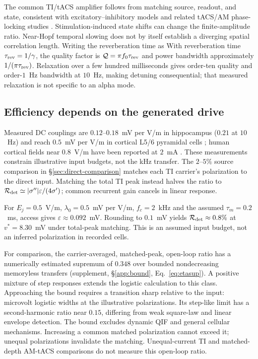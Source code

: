 \documentclass[11pt,a4paper]{article}
\newcommand{\Sig}{\sigma}
\providecommand{\DIFaddtex}[1]{{\protect\color{blue} \sf #1}} %
\providecommand{\DIFdeltex}[1]{{\protect\color{red} \scriptsize #1}} %
\providecommand{\DIFaddbegin}{} %
\providecommand{\DIFaddend}{} %
\providecommand{\DIFdelbegin}{} %
\providecommand{\DIFdelend}{} %
\providecommand{\DIFadd}[1]{\texorpdfstring{\DIFaddtex{#1}}{#1}} %
\providecommand{\DIFdel}[1]{\texorpdfstring{\DIFdeltex{#1}}{}} %
\begin{document}
The common TI/tACS amplifier follows from matching source, readout, and state,
consistent with excitatory--inhibitory models \cite{ledoux2011,clusella2023}
and related tACS/AM phase-locking studies
\cite{ali2013,negahbani2018,krause2023}. Stimulation-induced state shifts can
change the finite-amplitude ratio. Near-Hopf temporal slowing does not by itself
establish a diverging spatial correlation length. \DIFdelbegin \DIFdel{Writing the reverberation time
as }\DIFdelend \DIFaddbegin \DIFadd{With reverberation time
}\DIFaddend $\tau_{\rm rev}=1/\gamma$, the quality factor is $\mathcal Q=\pi f_0\tau_{\rm rev}$
and power bandwidth approximately $1/(\pi\tau_{\rm rev})$.
Relaxation over a few hundred milliseconds \cite{wilting2018} gives
order-ten quality and order-$1$~Hz bandwidth at $10$~Hz, making detuning
consequential; that measured relaxation is not specific to an alpha mode.

\subsection{Efficiency depends on the generated drive}
Measured DC couplings are $0.12$--$0.18$~mV per V/m in hippocampus
($0.21$ at $10$~Hz) \cite{bikson2004,deans2007} and reach $0.5$~mV per V/m
in cortical L5/6 pyramidal cells \cite{radman2009}; human cortical fields near
$0.8$~V/m have been reported at $2$~mA \cite{huang2017,huang2017corr}.
These measurements constrain illustrative input budgets, not the kHz transfer.
The $2$--$5\%$ source comparison in \S\ref{sec:direct-comparison} matches
each TI carrier's polarization to the direct input. Matching the total TI
peak instead halves the ratio to
$\mathcal R_{\rm det}\simeq|\Sig''|\varepsilon/(4\Sig')$; common recurrent
gain cancels in linear response.

For $E_j=0.5$~V/m, $\lambda_0=0.5$~mV per V/m, $f_c=2$~kHz and the assumed
$\tau_m=0.2$~ms, access gives $\varepsilon\approx0.092$~mV. Rounding to
$0.1$~mV yields $\mathcal R_{\rm det}\approx0.8\%$ at $v^*=8.30$~mV
under total-peak matching. This is an assumed input budget, not an inferred
polarization in recorded cells.

For comparison, the carrier-averaged, matched-peak, open-loop ratio has a
numerically estimated supremum of $0.348$ over bounded nondecreasing memoryless
transfers (supplement, \S\ref{app:bound}, Eq.~\eqref{eq:etasup}). A positive
mixture of step responses extends the logistic calculation to this class.
Approaching the bound requires a transition sharp relative to the input:
microvolt logistic widths at the illustrative polarizations. Its step-like
limit has a second-harmonic ratio near $0.15$, differing from weak square-law
and linear envelope detection. The bound excludes dynamic QIF and general
cellular mechanisms. Increasing a common matched polarization cannot exceed
it; unequal polarizations invalidate the matching. Unequal-current TI and
matched-depth AM-tACS comparisons do not measure this open-loop ratio.
\end{document}
